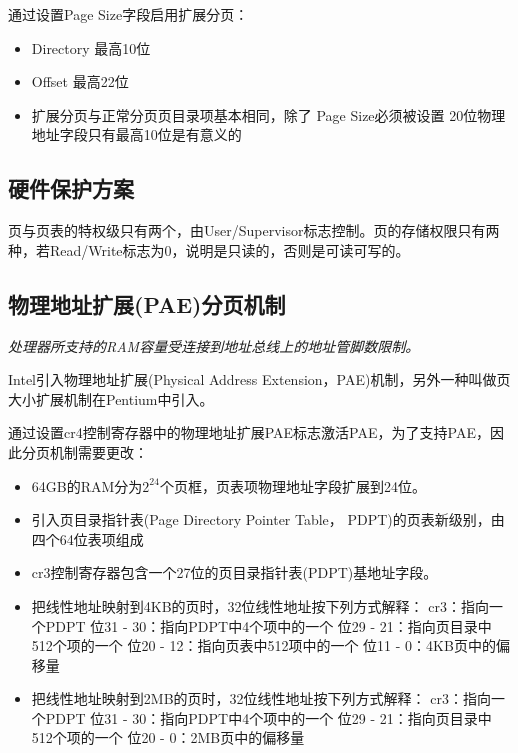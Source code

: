     通过设置Page Size字段启用扩展分页：

\begin{itemize}
    \item Directory
    \subitem 最高10位
    \item Offset
    \subitem 最高22位
    \item 扩展分页与正常分页页目录项基本相同，除了
    \subitem Page Size必须被设置
    \subitem 20位物理地址字段只有最高10位是有意义的
\end{itemize}

\subsection{硬件保护方案}

    页与页表的特权级只有两个，由User/Supervisor标志控制。页的存储权限只有两种，若Read/Write标志为0，说明是只读的，否则是可读可写的。

\subsection{物理地址扩展(PAE)分页机制}

    \emph{处理器所支持的RAM容量受连接到地址总线上的地址管脚数限制。}

    Intel引入物理地址扩展(Physical Address Extension，PAE)机制，另外一种叫做页大小扩展机制在Pentium中引入。

    通过设置cr4控制寄存器中的物理地址扩展PAE标志激活PAE，为了支持PAE，因此分页机制需要更改：

\begin{itemize}
    \item 64GB的RAM分为$2^{24}$个页框，页表项物理地址字段扩展到24位。
    \item 引入页目录指针表(Page Directory Pointer Table， PDPT)的页表新级别，由四个64位表项组成
    \item cr3控制寄存器包含一个27位的页目录指针表(PDPT)基地址字段。
    \item 把线性地址映射到4KB的页时，32位线性地址按下列方式解释：
    \subitem cr3：指向一个PDPT
    \subitem 位31 - 30：指向PDPT中4个项中的一个
    \subitem 位29 - 21：指向页目录中512个项的一个
    \subitem 位20 - 12：指向页表中512项中的一个
    \subitem 位11 - 0：4KB页中的偏移量
    \item 把线性地址映射到2MB的页时，32位线性地址按下列方式解释：
    \subitem cr3：指向一个PDPT
    \subitem 位31 - 30：指向PDPT中4个项中的一个
    \subitem 位29 - 21：指向页目录中512个项的一个
    \subitem 位20 - 0：2MB页中的偏移量
\end{itemize}


